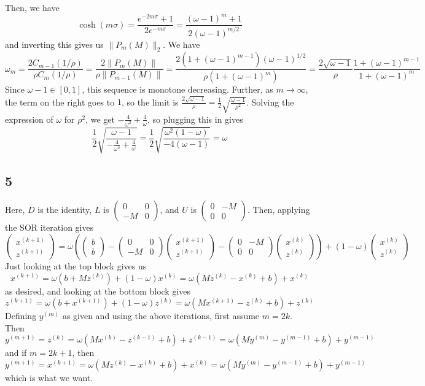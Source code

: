 \documentclass{article}
\newcommand{\openm}{\begin{pmatrix}}
\newcommand{\closem}{\end{pmatrix}}
\begin{document}
Then, we have
\[\cosh(m\sigma)=\frac{e^{-2m\sigma}+1}{2e^{-m\sigma}}=\frac{(\omega-1)^m+1}{2(\omega-1)^{m/2}}\]
and inverting this gives us $\|P_m(M)\|_2$.
We have
\[\omega_m=\frac{2C_{m-1}(1/\rho)}{\rho C_{m}(1/\rho)}=\frac{2\|P_m(M)\|}{\rho\|P_{m-1}(M)\|}=\frac{2(1+(\omega-1)^{m-1})(\omega-1)^{1/2}}{\rho(1+(\omega-1)^m)}=\frac{2\sqrt{\omega-1}}{\rho}\frac{1+(\omega-1)^{m-1}}{1+(\omega-1)^m}\]
Since $\omega-1\in[0,1]$, this sequence is monotone decreasing. Further, as $m\to\infty$, the term on the right goes to $1$, so the limit is $\frac{2\sqrt{\omega-1}}{\rho}=\frac{1}{2}\sqrt{\frac{\omega-1}{\rho^2}}$. Solving the expression of $\omega$ for $\rho^2$, we get $-\frac{4}{\omega^2}+\frac{4}{\omega}$, so plugging this in gives
\[\frac{1}{2}\sqrt{\frac{\omega-1}{-\frac{4}{\omega^2}+\frac{4}{\omega}}}=\frac{1}{2}\sqrt{\frac{\omega^2(1-\omega)}{-4(\omega-1)}}=\omega\]

\subsection*{5}
Here, $D$ is the identity, $L$ is $\openm0&0\\-M&0\closem$, and $U$ is $\openm0&-M\\0&0\closem$. Then, applying the SOR iteration gives
\[\openm x^{(k+1)}\\z^{(k+1)}\closem=\omega\left(\openm b\\b\closem-\openm0&0\\-M&0\closem\openm x^{(k+1)}\\z^{(k+1)}\closem-\openm0&-M\\0&0\closem\openm x^{(k)}\\z^{(k)}\closem\right)+(1-\omega)\openm x^{(k)}\\z^{(k)}\closem\]
Just looking at the top block gives us
\[x^{(k+1)}=\omega(b+Mz^{(k)})+(1-\omega)x^{(k)}=\omega(Mz^{(k)}-x^{(k)}+b)+x^{(k)}\]
as desired, and looking at the bottom block gives
\[z^{(k+1)}=\omega(b+x^{(k+1)})+(1-\omega)z^{(k)}=\omega(Mx^{(k+1)}-z^{(k)}+b)+z^{(k)}\]
Defining $y^{(m)}$ as given and using the above iterations, first assume $m=2k$. Then
\[y^{(m+1)}=z^{(k)}=\omega(Mx^{(k)}-z^{(k-1)}+b)+z^{(k-1)}=\omega(My^{(m)}-y^{(m-1)}+b)+y^{(m-1)}\]
and if $m=2k+1$, then
\[y^{(m+1)}=x^{(k+1)}=\omega(Mz^{(k)}-x^{(k)}+b)+x^{(k)}=\omega(My^{(m)}-y^{(m-1)}+b)+y^{(m-1)}\]
which is what we want.
\end{document}
